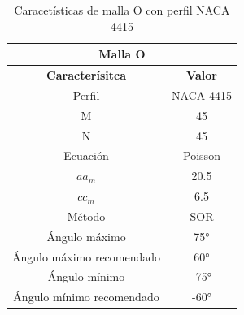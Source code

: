 \documentclass[letterpaper, openright, 12pt]{book}
\begin{document}
    \begin{table}[htbp!]
    \begin{center}
        \begin{tabular}{ | c | c |}
        \hline
        \multicolumn{2}{|c|}{Malla O}\\

        \hline
        \textbf{Caracterísitca} & \textbf{Valor} \\ \hline

        Perfil & NACA 4415
        \\ \hline

        M & 45
        \\ \hline

        N & 45
        \\ \hline

        Ecuación & Poisson
        \\\hline

        $aa_m$ & 20.5
        \\ \hline

        $cc_m$ & 6.5
        \\ \hline

        Método & SOR
        \\\hline

        Ángulo máximo & 75\si{\degree}
        \\ \hline

        Ángulo máximo recomendado & 60\si{\degree}
        \\ \hline

        Ángulo mínimo & -75\si{\degree}
        \\ \hline

        Ángulo mínimo recomendado & -60\si{\degree}
        \\ \hline
        \end{tabular}
        \caption{Caracetísticas de malla O con perfil NACA 4415}
    \label{tabla_o_naca_4415}
    \end{center}
    \end{table}
\end{document}

